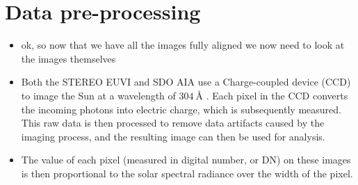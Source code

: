 \documentclass[11pt,a4paper,onecolumn]{report}
\begin{document}
\section{Data pre-processing}

\label{sec:Data prep}


\begin{itemize}
  \item ok, so now that we have all the images fully aligned we now need to look
  at the images themselves
  \item Both the STEREO EUVI and SDO AIA use a Charge-coupled device (CCD) to
  image the Sun at a wavelength of
  \(\SI[]{304}[]{\angstrom}\) \citep{kaiser_stereo_2008,lemen_atmospheric_2012}.
  Each pixel in the CCD converts the incoming photons into electric charge,
  which is subsequently measured. This raw data is then processed to remove data
  artifacts caused by the imaging process, and the resulting image can then be
  used for analysis.  
  \item The value of each pixel (measured in digital number, or DN) on these images is then proportional to the
  solar spectral radiance over the width of the pixel.
\end{itemize}
\end{document}
